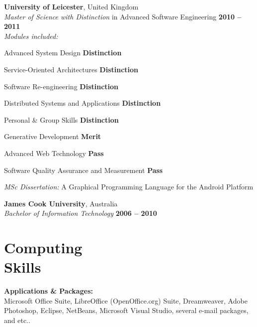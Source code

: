 \documentclass[margin,line]{resume}
\begin{document}
\begin{resume}
    \textbf{University of Leicester}, United Kingdom \vspace{2mm}\\\vspace{1mm}%
    \textsl{Master of Science with Distinction} in Advanced Software Engineering \hfill \textbf{2010 -- 2011}\\\vspace{-1mm}%
    \textsl{Modules included:}\\\vspace{-3mm}
    \begin{list2}
    \item Advanced System Design                      \hfill  \textbf{Distinction}
    \item Service-Oriented Architectures              \hfill  \textbf{Distinction}
    \item Software Re-engineering                     \hfill  \textbf{Distinction}
    \item Distributed Systems and Applications        \hfill  \textbf{Distinction}
    \item Personal \& Group Skills                    \hfill  \textbf{Distinction}
    \item Generative Development                      \hfill  \textbf{Merit}
    \item Advanced Web Technology                     \hfill  \textbf{Pass}
    \item Software Quality Assurance and Measurement  \hfill  \textbf{Pass}
    \end{list2}
    \textsl{MSc Dissertation:} A Graphical Programming Language for the Android Platform \vspace{-1.5mm}

    \textbf{James Cook University}, Australia \vspace{2mm}\\\vspace{1mm}%
    \textsl{Bachelor of Information Technology} \hfill \textbf{2006 -- 2010}\\\vspace{-3mm}


    \section{\mysidestyle Computing\\Skills}

    \textbf{Applications \& Packages:} \vspace{2mm}\\\vspace{1mm}%
    Microsoft Office Suite, LibreOffice (OpenOffice.org) Suite, Dreamweaver, Adobe Photoshop, Eclipse, NetBeans, Microsoft Visual Studio, several e-mail packages, and etc..


\end{resume}
\end{document}
